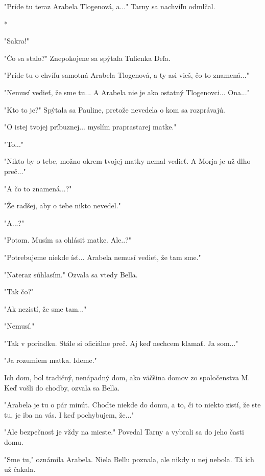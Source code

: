 \documentclass{book}
\begin{document}
"$ $Príde tu teraz Arabela Tlogenová, a..."$ $  Tarny sa nachvíľu odmlčal.

\begin{center}

*

\end{center}

"$ $Sakra!"$ $ 

"$ $Čo sa stalo?"$ $  Znepokojene sa spýtala Tulienka Deľa.

"$ $Príde tu o chvíľu samotná Arabela Tlogenová, a ty asi vieš, čo to znamená..."$ $ 

"$ $Nemusí vedieť, že sme tu... A Arabela nie je ako ostatný Tlogenovci... Ona..."$ $ 

"$ $Kto to je?"$ $  Spýtala sa Pauline, pretože nevedela o kom sa rozprávajú.

"$ $O istej tvojej príbuznej... myslím praprastarej matke."$ $ 

"$ $To..."$ $ 

"$ $Nikto by o tebe, možno okrem tvojej matky nemal vedieť. A Morja je už dlho preč..."$ $ 

"$ $A čo to znamená...?"$ $ 

"$ $Že radšej, aby o tebe nikto nevedel."$ $ 

"$ $A...?"$ $ 

"$ $Potom. Musím sa ohlásiť matke. Ale..?"$ $ 

"$ $Potrebujeme niekde ísť... Arabela nemusí vedieť, že tam sme."$ $ 

"$ $Nateraz súhlasím."$ $  Ozvala sa vtedy Bella.

"$ $Tak čo?"$ $ 

"$ $Ak nezistí, že sme tam..."$ $ 

"$ $Nemusí."$ $ 

"$ $Tak v poriadku. Stále si oficiálne preč. Aj keď nechcem klamať. Ja som..."$ $ 

"$ $Ja rozumiem matka. Ideme."$ $ 

Ich dom, bol tradičný, nenápadný dom, ako väčšina domov zo spoločenstva M. Keď vošli do chodby, ozvala sa Bella.

"$ $Arabela je tu o pár minút. Choďte niekde do domu, a to, či to niekto zistí, že ste tu, je iba na vás. I keď pochybujem, že..."$ $ 

"$ $Ale bezpečnosť je vždy na mieste."$ $  Povedal Tarny a vybrali sa do jeho časti domu.

"$ $Sme tu,"$ $  oznámila Arabela. Niela Bellu poznala, ale nikdy u nej nebola. Tá ich už čakala.
\end{document}
